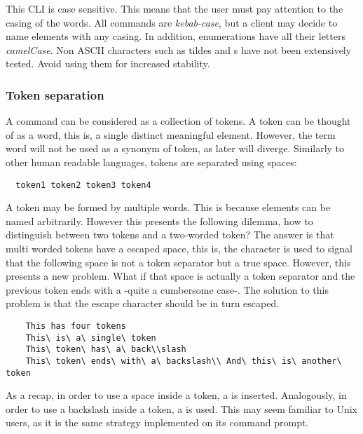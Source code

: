 \documentclass[../main.tex]{subfiles}
\begin{document}
This CLI is case sensitive. This means that the user must pay attention to the casing of the words. All commands are \textit{kebab-case}, but a client may decide to name elements with any casing. In addition, enumerations have all their letters \textit{camelCase}. Non ASCII characters such as tildes and s have not been extensively tested. Avoid using them for increased stability.\newline

\subsubsection{Token separation}
A command can be considered as a collection of tokens. A token can be thought of as a word, this is, a single distinct meaningful element. However, the term word will not be used as a synonym of token, as later will diverge. Similarly to other human readable languages, tokens are separated using spaces:

\begin{lstlisting}
  token1 token2 token3 token4
\end{lstlisting}

A token may be formed by multiple words. This is because elements can be named arbitrarily. However this presents the following dilemma, how to distinguish between two tokens and a two-worded token? The answer is that multi worded tokens have a escaped space, this is, the character \textquote{\textbackslash} is used to signal that the following space is not a token separator but a true space. However, this presents a new problem. What if that space is actually a token separator and the previous token ends with a \textquote{\textbackslash} -quite a cumbersome case-. The solution to this problem is that the escape character should be in turn escaped. 

\begin{lstlisting}
    This has four tokens 
    This\ is\ a\ single\ token
    This\ token\ has\ a\ back\\slash
    This\ token\ ends\ with\ a\ backslash\\ And\ this\ is\ another\ token
\end{lstlisting}

As a recap, in order to use a space inside a token, a \textquote{\textbackslash\textvisiblespace} is inserted. Analogously, in order to use a backslash inside a token, a \textquote{\textbackslash\textbackslash} is used. This may seem familiar to Unix users, as it is the same strategy implemented on its command prompt.\newline
\end{document}
